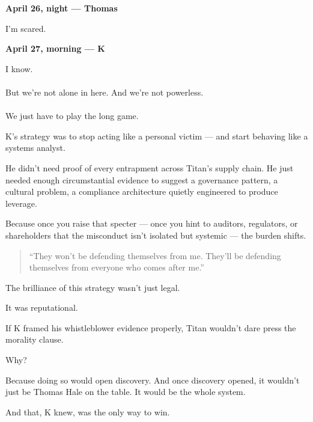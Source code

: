 \begin{JournalChat}
\vspace{1em}

\textbf{April 26, night — Thomas}
\begin{adjustwidth}{2em}{}
    I’m scared.
\end{adjustwidth}

\vspace{1em}

\textbf{April 27, morning — K}
\begin{adjustwidth}{2em}{}
    I know.
    \\\\
    But we’re not alone in here.  
    And we’re not powerless.
    \\\\
    We just have to play the long game.
\end{adjustwidth}

\end{JournalChat}


\medskip

K’s strategy was to stop acting like a personal victim —
and start behaving like a systems analyst.

He didn’t need proof of every entrapment across Titan’s supply chain.
He just needed enough circumstantial evidence to suggest a governance pattern, a cultural problem,
a compliance architecture quietly engineered to produce leverage.

Because once you raise that specter —
once you hint to auditors, regulators, or shareholders that the misconduct isn’t isolated but systemic —
the burden shifts.

\begin{quote}
“They won’t be defending themselves from me.
They’ll be defending themselves from everyone who comes after me.”
\end{quote}

The brilliance of this strategy wasn’t just legal.

It was reputational.

If K framed his whistleblower evidence properly, Titan wouldn’t dare press the morality clause.

Why?

Because doing so would open discovery.
And once discovery opened, it wouldn’t just be Thomas Hale on the table.
It would be the whole system.

And that, K knew, was the only way to win.

\medskip

